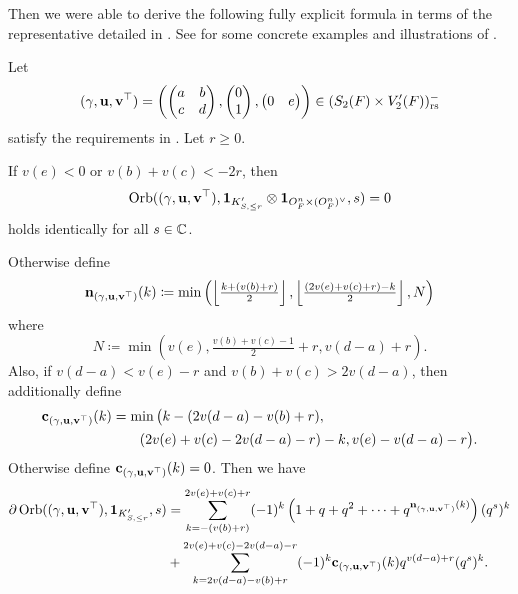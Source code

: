 Then we were able to derive the following fully explicit formula
in terms of the representative detailed in .
See  for some concrete examples
and illustrations of .
\begin{theorem}
  \label{thm:semi_lie_formula}
  Let
  \[
    {(\gamma, \mathbf u, \mathbf v^\top)} = \left( \begin{pmatrix} a & b \\ c & d \end{pmatrix},
      \begin{pmatrix} 0 \\ 1 \end{pmatrix},
      \begin{pmatrix} 0 & e \end{pmatrix} \right)
    \in (S_2(F) \times V_2'(F))_{\mathrm{rs}}^-
  \]
  satisfy the requirements in .
  Let $r \ge 0$.

  If $v(e) < 0$ or $v(b) + v(c) < -2r$, then
  \[ \operatorname{Orb}({(\gamma, \mathbf u, \mathbf v^\top)}, \mathbf{1}_{K'_{S, \le r}} \otimes \mathbf{1}_{O_F^n \times (O_F^n)^\vee}, s) = 0 \]
  holds identically for all $s \in \mathbb C$.

  Otherwise define
  \[ \mathbf n_{(\gamma, \mathbf u, \mathbf v^\top)}(k) \coloneqq \min\left( \left\lfloor \tfrac{k + (v(b)+r)}{2} \right\rfloor,
    \left\lfloor \tfrac{(2v(e)+v(c)+r)-k}{2} \right\rfloor, N \right) \]
  where
  \[ N \coloneqq \min \left(
      v(e), \tfrac{v(b)+v(c)-1}{2} + r,
      v(d-a) + r \right). \]
  Also, if $v(d-a) < v(e) - r$ and $v(b) + v(c) > 2v(d-a)$, then additionally define
  \begin{align*}
    \mathbf c_{(\gamma, \mathbf u, \mathbf v^\top)}(k) &= \min\big( k - (2v(d-a)-v(b)+r), \\
      &\qquad (2v(e)+v(c)-2v(d-a)-r)-k, v(e)-v(d-a)-r \big).
  \end{align*}
  Otherwise define $\mathbf c_{(\gamma, \mathbf u, \mathbf v^\top)}(k) = 0$.
  Then we have
  \begin{align*}
    \partial\operatorname{Orb}({(\gamma, \mathbf u, \mathbf v^\top)}, \mathbf{1}_{K'_{S, \le r}}, s)
    &= \sum_{k = -(v(b)+r)}^{2v(e)+v(c)+r} (-1)^k
    \left( 1 + q + q^2 + \dots + q^{\mathbf n_{(\gamma, \mathbf u, \mathbf v^\top)}(k)} \right) (q^s)^k \\
    &+ \sum_{k = 2v(d-a)-v(b)+r}^{2v(e)+v(c)-2v(d-a)-r} (-1)^k \mathbf c_{(\gamma, \mathbf u, \mathbf v^\top)}(k) q^{v(d-a) + r} (q^s)^k.
  \end{align*}
\end{theorem}

